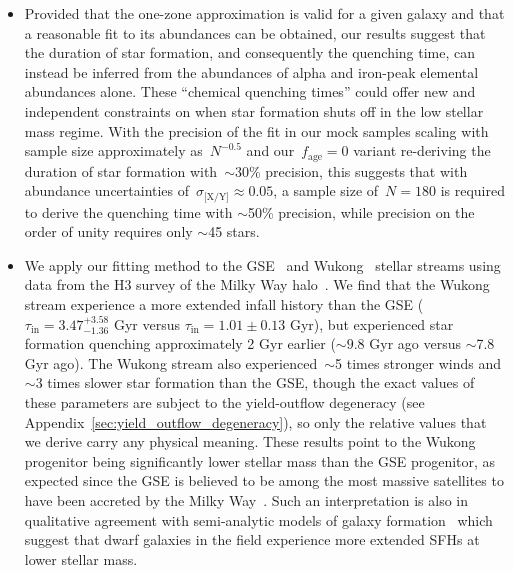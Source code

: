 \documentclass[ms.tex]{subfiles}
\begin{document}
\begin{itemize}
	\item Provided that the one-zone approximation is valid for a given galaxy
	and that a reasonable fit to its abundances can be obtained, our results
	suggest that the duration of star formation, and consequently the quenching
	time, can instead be inferred from the abundances of alpha and iron-peak
	elemental abundances alone.
	These ``chemical quenching times'' could offer new and independent
	constraints on when star formation shuts off in the low stellar mass
	regime.
	With the precision of the fit in our mock samples scaling with sample size
	approximately as~$N^{-0.5}$ and our~$f_\text{age} = 0$ variant re-deriving
	the duration of star formation with~$\sim$30\% precision, this suggests
	that with abundance uncertainties of~$\sigma_\text{[X/Y]} \approx 0.05$,
	a sample size of~$N = 180$ is required to derive the quenching time with
	$\sim$50\% precision, while precision on the order of unity requires only
	$\sim$45 stars.

	\item We apply our fitting method to the GSE~\citep{Belokurov2018,
	Helmi2018} and Wukong~\citep{Naidu2020, Naidu2022} stellar streams using
	data from the H3 survey of the Milky Way halo~\citep{Conroy2019}.
	We find that the Wukong stream experience a more extended infall history
	than the GSE ($\tau_\text{in} = 3.47^{+3.58}_{-1.36}$ Gyr versus
	$\tau_\text{in} = 1.01 \pm 0.13$ Gyr), but experienced star formation
	quenching approximately 2 Gyr earlier ($\sim9.8$ Gyr ago versus
	$\sim$7.8 Gyr ago).
	The Wukong stream also experienced~$\sim$5 times stronger winds and
	$\sim$3 times slower star formation than the GSE, though the exact values
	of these parameters are subject to the yield-outflow degeneracy (see
	Appendix~\ref{sec:yield_outflow_degeneracy}), so only the relative values
	that we derive carry any physical meaning.
	These results point to the Wukong progenitor being significantly lower
	stellar mass than the GSE progenitor, as expected since the GSE is believed
	to be among the most massive satellites to have been accreted by the Milky
	Way~\citep{Myeong2018, Deason2019, Fattahi2019, Mackereth2019,
	Vincenzo2019}.
	Such an interpretation is also in qualitative agreement with semi-analytic
	models of galaxy formation~\citep[e.g.][]{Baugh2005, Baugh2006, Bower2006,
	Benson2012, Somerville2015a, Somerville2015b, Croton2016, Behroozi2019}
	which suggest that dwarf galaxies in the field experience more extended
	SFHs at lower stellar mass.


\end{itemize}
\end{document}
